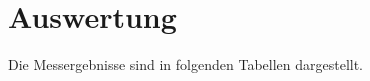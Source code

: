 \section{Auswertung}
\label{sec:Auswertung}
Die Messergebnisse sind in folgenden Tabellen dargestellt.
